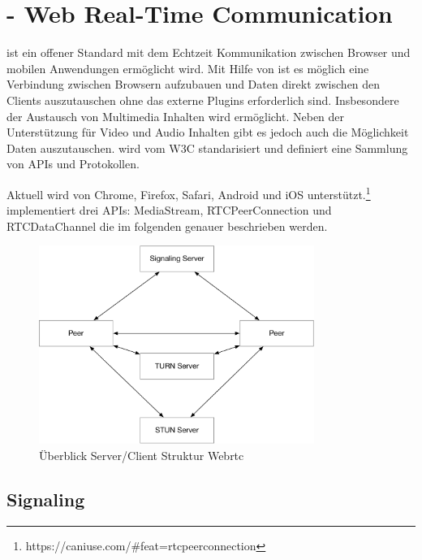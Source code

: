 \section{\webrtc - Web Real-Time Communication}

\webrtc ist ein offener Standard mit dem Echtzeit Kommunikation zwischen Browser und mobilen Anwendungen ermöglicht wird. Mit Hilfe von \webrtc ist es möglich eine \pTp Verbindung zwischen Browsern aufzubauen und Daten direkt zwischen den Clients auszutauschen ohne das externe Plugins erforderlich sind. Insbesondere der Austausch von Multimedia Inhalten wird ermöglicht. Neben der Unterstützung für Video und Audio Inhalten gibt es jedoch auch die Möglichkeit Daten auszutauschen. \webrtc wird vom W3C\cite{w3Webrtc} standarisiert und definiert eine Sammlung von APIs und Protokollen.


Aktuell wird \webrtc von Chrome, Firefox, Safari, Android und iOS unterstützt.\footnote{https://caniuse.com/\#feat=rtcpeerconnection} \webrtc implementiert drei APIs: MediaStream, RTCPeerConnection und RTCDataChannel die im folgenden genauer beschrieben werden.

\begin{figure}[!h]
	\centering
	\includegraphics[width=0.8\textwidth]{figures/Webrtc_overview}
	\caption[A Figure Short-Title]{Überblick Server/Client Struktur Webrtc}
	\label{fig:webrtc_overview}
\end{figure}




\subsection{Signaling}

